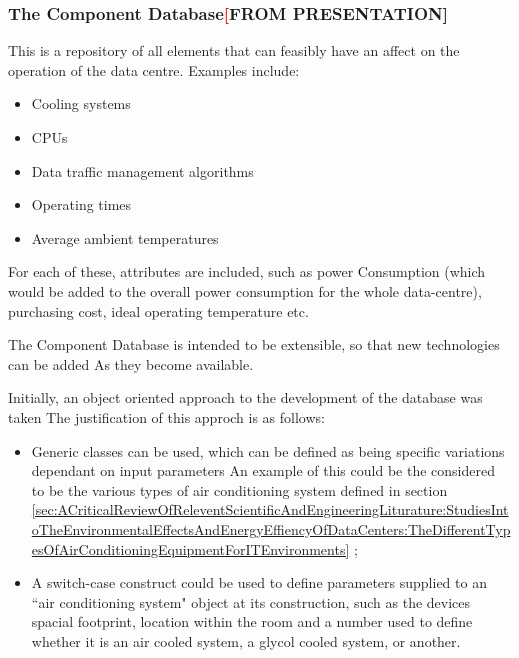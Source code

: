 \subsubsection{The Component Database\textcolor{red}[FROM PRESENTATION]}
\label{sec:Methodology:TechnicalOverview:TheComponentDatabase}
This is a repository of all elements that can feasibly have an affect 
on the operation of the data centre. Examples include:

\begin{itemize}
\item Cooling systems
\item CPUs
\item Data traffic management algorithms
\item Operating times
\item Average ambient temperatures
\end{itemize}

For each of these, attributes are included, such as power
Consumption (which would be added to the overall power
consumption for the whole data-centre), purchasing cost, ideal operating 
temperature etc.

The Component Database is intended to be extensible, so that 
new technologies can be added As they become available.

Initially, an object oriented approach to the development of the database was taken
The justification of this approch is as follows:

\begin{itemize}

\item Generic classes can be used, which can be defined as being specific variations
 dependant on input parameters An example of this could be the considered to be the various
types of air conditioning system defined in section \ref{sec:ACriticalReviewOfReleventScientificAndEngineeringLiturature:StudiesIntoTheEnvironmentalEffectsAndEnergyEffiencyOfDataCenters:TheDifferentTypesOfAirConditioningEquipmentForITEnvironments}
\cite{TonyEvansTheDifferentTypesOfAirConditioningEquipmentForITEnvironmentsWhitePaper};

\item A switch-case construct could be used to define parameters supplied to an ``air conditioning system"
object at its construction, such as the devices spacial footprint, location within the room and a number 
used to define whether it is an air cooled system, a glycol cooled system, or another.

\end{itemize}

